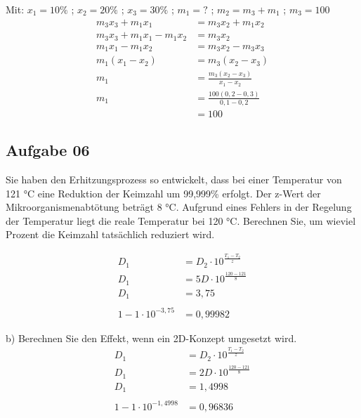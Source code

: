 \documentclass[a4paper,10pt]{article}
\begin{document}
\pp
Mit: $x_1 = 10\% $ ; $x_2 = 20\%$ ; $x_3 = 30\% $ ; $m_1 = ? $ ; $m_2 = m_3 + m_1$ ; $m_3 = 100$ 
\begin{align*}
m_3x_3 + m_1x_1 			&= m_3x_2 + m_1x_2 \\
m_3x_3 + m_1x_1 - m_1x_2 	&= m_3x_2 \\
m_1x_1 - m_1x_2 			&= m_3x_2 - m_3x_3 \\
m_1(x_1 - x_2) 				&= m_3(x_2-x_3) \\
m_1 						&= \frac{m_3(x_2-x_3)}{x_1 - x_2} \\
m_1 						&= \frac{100(0,2-0,3)}{0,1 - 0,2} \\
&= 100
\end{align*}
\subsection*{Aufgabe 06}
Sie haben den Erhitzungsprozess so entwickelt, dass bei einer Temperatur von 121 °C eine
Reduktion der Keimzahl um 99,999\% erfolgt. Der z-Wert der Mikroorganismenabtötung
beträgt 8 °C. Aufgrund eines Fehlers in der Regelung der Temperatur liegt die reale
Temperatur bei 120 °C. Berechnen Sie, um wieviel Prozent die Keimzahl tatsächlich reduziert
wird.

\begin{align*}
D_1 &= D_2 \cdot 10^{\frac{T_1-T_2}{z}} \\
D_1 &= 5 D \cdot 10^{\frac{120-121}{8}} \\
D_1 &= 3,75 \\
\\
1 - 1 \cdot 10^{-3,75} &= 0,99982
\end{align*}


\pp
b) Berechnen Sie den Effekt, wenn ein 2D-Konzept umgesetzt wird.
\begin{align*}
D_1 &= D_2 \cdot 10^{\frac{T_1-T_2}{z}} \\
D_1 &= 2 D \cdot 10^{\frac{120-121}{8}} \\
D_1 &= 1,4998 \\
\\
1 - 1 \cdot 10^{-1,4998} &= 0,96836
\end{align*}
\end{document}
